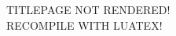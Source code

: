 \hypersetup{pageanchor=false}
\begin{titlepage}
	\begin{center}
		\ifLuaTeX
		\else
			\large{TITLEPAGE NOT RENDERED!\\RECOMPILE WITH LUATEX!}
		\fi
	\end{center}
\end{titlepage}
\hypersetup{pageanchor=true}